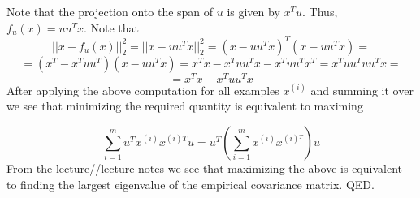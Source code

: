 \begin{answer}
Note that the projection onto the span of $u$ is given by $x^Tu.$ Thus, $f_u(x) = uu^Tx.$
Note that
$$||x - f_u(x)||_2^2 =  ||x - uu^Tx||_2^2 =  (x - uu^Tx)^T(x - uu^Tx) = $$
$$= (x^T - x^Tuu^T)(x - uu^Tx) = x^Tx - x^Tuu^Tx - x^Tuu^Tx^T = x^Tuu^Tuu^Tx=$$
$$= x^Tx - x^Tuu^Tx$$
After applying the above computation for all examples $x^{(i)}$ and summing it over we see that minimizing the required quantity is
equivalent to maximing

$$
\sum_{i=1}^m u^Tx^{(i)}x^{(i)T}u = u^T(\sum_{i=1}^mx^{(i)}x^{(i){^T}}) u
$$
From the lecture//lecture notes we see that maximizing the above is equivalent to finding the largest eigenvalue of the empirical covariance matrix. QED.





\end{answer}
